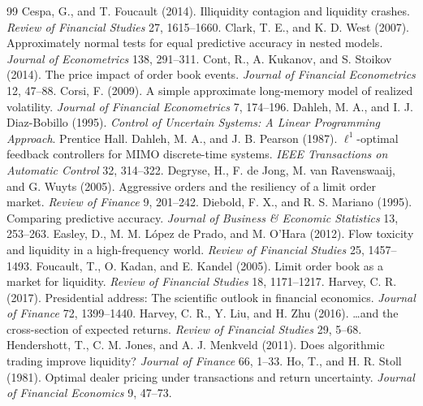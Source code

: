 \begin{thebibliography}{99}
 Cespa, G., and T. Foucault (2014). Illiquidity contagion and liquidity crashes. \emph{Review of Financial Studies} 27, 1615--1660.
 Clark, T. E., and K. D. West (2007). Approximately normal tests for equal predictive accuracy in nested models. \emph{Journal of Econometrics} 138, 291--311.
 Cont, R., A. Kukanov, and S. Stoikov (2014). The price impact of order book events. \emph{Journal of Financial Econometrics} 12, 47--88.
 Corsi, F. (2009). A simple approximate long-memory model of realized volatility. \emph{Journal of Financial Econometrics} 7, 174--196.
 Dahleh, M. A., and I. J. Diaz-Bobillo (1995). \emph{Control of Uncertain Systems: A Linear Programming Approach}. Prentice Hall.
 Dahleh, M. A., and J. B. Pearson (1987). $\ell^1$-optimal feedback controllers for MIMO discrete-time systems. \emph{IEEE Transactions on Automatic Control} 32, 314--322.
 Degryse, H., F. de Jong, M. van Ravenswaaij, and G. Wuyts (2005). Aggressive orders and the resiliency of a limit order market. \emph{Review of Finance} 9, 201--242.
 Diebold, F. X., and R. S. Mariano (1995). Comparing predictive accuracy. \emph{Journal of Business \& Economic Statistics} 13, 253--263.
 Easley, D., M. M. L\'opez de Prado, and M. O'Hara (2012). Flow toxicity and liquidity in a high-frequency world. \emph{Review of Financial Studies} 25, 1457--1493.
 Foucault, T., O. Kadan, and E. Kandel (2005). Limit order book as a market for liquidity. \emph{Review of Financial Studies} 18, 1171--1217.
 Harvey, C. R. (2017). Presidential address: The scientific outlook in financial economics. \emph{Journal of Finance} 72, 1399--1440.
 Harvey, C. R., Y. Liu, and H. Zhu (2016). \ldots and the cross-section of expected returns. \emph{Review of Financial Studies} 29, 5--68.
 Hendershott, T., C. M. Jones, and A. J. Menkveld (2011). Does algorithmic trading improve liquidity? \emph{Journal of Finance} 66, 1--33.
 Ho, T., and H. R. Stoll (1981). Optimal dealer pricing under transactions and return uncertainty. \emph{Journal of Financial Economics} 9, 47--73.

\end{thebibliography}

